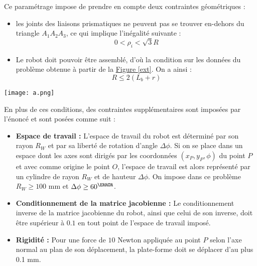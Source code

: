\documentclass{article}
\newenvironment{Figure}
  {\par\medskip\noindent\minipage{\linewidth}}
  {\endminipage\par\medskip}
\begin{document}
\begin{multicols*}{2}
Ce paramétrage impose de prendre en compte deux contraintes géométriques :
\begin{itemize}
    \item les joints des liaisons prismatiques  ne peuvent pas se trouver en-dehors du triangle $A_1 A_2 A_3$, ce qui implique l'inégalité suivante :
    \begin{equation}
        0< \rho_i < \sqrt{3} R
    \end{equation}
    \item Le robot doit pouvoir être assemblé, d'où la condition sur les données du problème obtenue à partir de la \hyperref[ext]{Figure \ref{ext}}. On a ainsi :
    \begin{equation}
       R \leq 2 (L_b+r) 
    \end{equation}
\end{itemize}

\begin{Figure}
\centering
\texttt{[image: a.png]}

 \label{ext}
\end{Figure}
En plus de ces conditions, des contraintes supplémentaires sont imposées par l'énoncé et sont posées comme suit :

\begin{itemize}
    \item \textbf{Espace de travail :} L'espace de travail du robot est déterminé par son rayon $R_W$ et par sa liberté de rotation d'angle $\Delta \phi$. Si on se place dans un espace dont les axes sont dirigés par les coordonnées $(x_P, y_P, \phi)$ du point $P$ et avec comme origine le point $O$, l'espace de travail est alors représenté par un cylindre de rayon $R_W$ et de hauteur $\Delta \phi$. On impose dans ce problème $R_W \geq 100$ mm et $\Delta \phi \geq 60 ^\degree$.  
    \item \textbf{Conditionnement de la matrice jacobienne :} Le conditionnement inverse de la matrice jacobienne du robot, ainsi que celui de son inverse, doit être supérieur à $0.1$ en tout point de l'espace de travail imposé.
    \item \textbf{Rigidité :} Pour une force de $10$ Newton appliquée au point $P$ selon l'axe normal au plan de son déplacement, la plate-forme doit se déplacer d'au plus 0.1 mm.
\end{itemize}




\end{multicols*}
\end{document}
